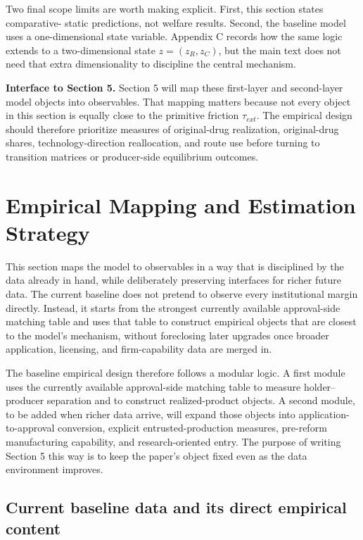 \documentclass[12pt]{article}
\begin{document}
Two final scope limits are worth making explicit. First, this section states comparative-
static predictions, not welfare results. Second, the baseline model uses a one-dimensional
state variable. Appendix C records how the same logic extends to a two-dimensional state
$z=(z_R,z_C)$, but the main text does not need that extra dimensionality to discipline the
central mechanism.

\textbf{Interface to Section 5.} Section 5 will map these first-layer and second-layer model objects
into observables. That mapping matters because not every object in this section is equally
close to the primitive friction $\tau_{ext}$. The empirical design should therefore prioritize measures
of original-drug realization, original-drug shares, technology-direction reallocation, and route
use before turning to transition matrices or producer-side equilibrium outcomes.


\section{Empirical Mapping and Estimation Strategy}

This section maps the model to observables in a way that is disciplined by the data already in
hand, while deliberately preserving interfaces for richer future data. The current baseline does
not pretend to observe every institutional margin directly. Instead, it starts from the strongest
currently available approval-side matching table and uses that table to construct empirical objects
that are closest to the model's mechanism, without foreclosing later upgrades once broader
application, licensing, and firm-capability data are merged in.

The baseline empirical design therefore follows a modular logic. A first module uses the
currently available approval-side matching table to measure holder--producer separation and
to construct realized-product objects. A second module, to be added when richer data arrive,
will expand those objects into application-to-approval conversion, explicit entrusted-production
measures, pre-reform manufacturing capability, and research-oriented entry. The purpose of
writing Section 5 this way is to keep the paper's object fixed even as the data environment
improves.

\subsection{Current baseline data and its direct empirical content}
\end{document}

